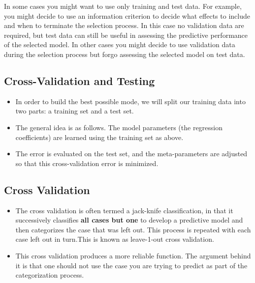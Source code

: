 \documentclass[a4paper,12pt]{article}
\begin{document}
In some cases you might want to use only training and test data. For example, you might decide to use an information criterion to decide what effects to include and when to terminate the selection process. In this case no validation data are required, but test data can still be useful in assessing the predictive performance of the selected model. In other cases you might decide to use validation data during the selection process but forgo assessing the selected model on test data. 


\subsection{Cross-Validation and Testing}
\begin{itemize}
	\item In order to build the best possible mode, we will split our training data into two parts: a training set and a test set. 
	
	\item 	The general idea is as follows. The model parameters (the regression coefficients) are learned using the training set as above. 
	\item The error is evaluated on the test set, and the meta-parameters are adjusted so that this cross-validation error is minimized. 
	
\end{itemize}	
\subsection{Cross Validation}
\begin{itemize}	
	\item The cross validation is often termed a jack-knife classification, in that
	it successively classifies \textbf{all cases but one} to develop a predictive model and then
	categorizes the case that was left out. This process is repeated with each case left out in
	turn.This is known as leave-1-out cross validation. 
	
	\item 	This cross validation produces a more reliable function. The argument behind it is that
	one should not use the case you are trying to predict as part of the categorization process.
\end{itemize}
\end{document}
